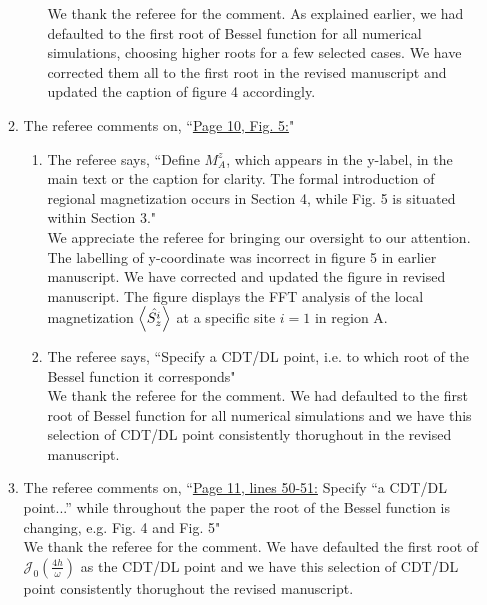\documentclass[aps,prb,reprint,showpacs,floatfix,superscriptaddress, onecolumn, nofootinbib, 10pt]{revtex4-2}
\newcommand{\response}[1]{{\color{black}#1}} %
\newcommand{\comment}[1]{{\color{blue}#1}} %
\begin{document}
\begin{enumerate}
\begin{enumerate}
\begin{enumerate}
			\response{We thank the referee for the comment. As explained earlier, we had defaulted to the first root of Bessel function for all numerical simulations, choosing higher roots for a few selected cases. We have corrected them all to the first root in the revised manuscript and updated the caption of figure 4 accordingly.}\\
		\end{enumerate}
		\item The referee comments on, \comment{``\underline{Page 10, Fig. 5:}"}
		\begin{enumerate}
			\item The referee says, \comment{``Define $M_A^z$, which appears in the y-label, in the main text or the caption for
			clarity. The formal introduction of regional magnetization occurs in Section 4, while Fig. 5 is situated within Section 3."}\\
			\response{We appreciate the referee for bringing our oversight to our attention. The labelling of y-coordinate was incorrect in figure 5 in earlier manuscript. We have corrected and updated the figure in revised manuscript. The figure displays the FFT analysis of the local magnetization $\expval{\hat{S_z^i}}$ at a specific site $i=1$ in region A.}\\
			
			\item The referee says, \comment{``Specify a CDT/DL point, i.e. to which root of the Bessel function it corresponds"}\\
			
			\response{We thank the referee for the comment. We had defaulted to the first root of Bessel function for all numerical simulations and we have this selection of CDT/DL point consistently thorughout in the revised manuscript.}\\
		\end{enumerate}
		\item The referee comments on, \comment{``\underline{Page 11, lines 50-51:} Specify “a CDT/DL point...” while throughout the paper the root of the Bessel function is changing, e.g. Fig. 4 and Fig. 5"}\\
		
		\response{We thank the referee for the comment. We have defaulted the first root of $\mathcal{J}_0\left(\frac{4h}{\omega}\right)$ as the CDT/DL point and we have this selection of CDT/DL point consistently thorughout the revised manuscript.}\\
		

\end{enumerate}
\end{enumerate}
\end{document}
